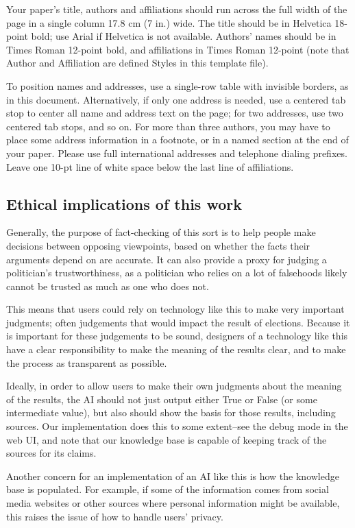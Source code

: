 \documentclass{chi2009}
\begin{document}
Your paper's title, authors and affiliations should run across the
full width of the page in a single column 17.8 cm (7 in.) wide.  The
title should be in Helvetica 18-point bold; use Arial if Helvetica is
not available.  Authors' names should be in Times Roman 12-point bold,
and affiliations in Times Roman 12-point (note that Author and
Affiliation are defined Styles in this template file).

To position names and addresses, use a single-row table with invisible
borders, as in this document.  Alternatively, if only one address is
needed, use a centered tab stop to center all name and address text on
the page; for two addresses, use two centered tab stops, and so
on. For more than three authors, you may have to place some address
information in a footnote, or in a named section at the end of your
paper. Please use full international addresses and telephone dialing
prefixes.  Leave one 10-pt line of white space below the last line of
affiliations.

\subsection{Ethical implications of this work}

Generally, the purpose of fact-checking of this sort is to help people make decisions between opposing viewpoints, based on whether the facts their arguments depend on are accurate.
It can also provide a proxy for judging a politician's trustworthiness, as a politician who relies on a lot of falsehoods likely cannot be trusted as much as one who does not.

This means that users could rely on technology like this to make very important judgments; often judgements that would impact the result of elections.
Because it is important for these judgements to be sound, designers of a technology like this have a clear responsibility to make the meaning of the results clear, and to make the process as transparent as possible.

Ideally, in order to allow users to make their own judgments about the meaning of the results, the AI should not just output either True or False (or some intermediate value), but also should show the basis for those results, including sources.
Our implementation does this to some extent--see the debug mode in the web UI, and note that our knowledge base is capable of keeping track of the sources for its claims.

Another concern for an implementation of an AI like this is how the knowledge base is populated.
For example, if some of the information comes from social media websites or other sources where personal information might be available, this raises the issue of how to handle users' privacy.
\end{document}
